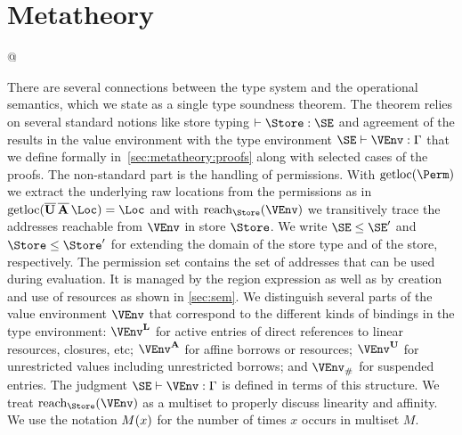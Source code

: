 \section{Metatheory}
\label{sec:metatheory}

\lstMakeShortInline[keepspaces,style=rule]@

There are several connections between the type system and
the operational semantics, which we state as a single type soundness
theorem.
%
The theorem relies on several standard notions like store typing
$\vdash \Store : \SE$ and agreement of the results in the value environment
with the type environment $\SE \vdash \VEnv:\E$ that we define
formally in~\cref{sec:metatheory:proofs} along with selected cases of the
proofs.
%
The non-standard part is the handling of permissions. With
$\Rawloc\Perm$ we extract the underlying raw locations from the
permissions as in $\Rawloc{\Multi\IBORROW\hspace{0.5mm}\Multi\MBORROW\hspace{0.5mm}\Loc} = \Loc$
and with $\Reach\Store\VEnv$ we transitively trace the
addresses reachable from $\VEnv$ in store $\Store$. We write
$\SE\le\SE'$ and $\Store \le \Store'$ for extending the domain of the
store type and of the store, respectively.
%
The permission set contains the set
of addresses that can be used during evaluation. It is managed by the
region expression as well as by creation and use of resources as
shown in \cref{sec:sem}.
%
We distinguish several parts of the value
environment $\VEnv$ that correspond to the different kinds of bindings in the
type environment: $\Active\VEnv$ for active entries of direct
references to linear resources, closures, etc; $\MutableBorrows\VEnv$ for
affine borrows or resources;
$\ImmutableBorrows\VEnv$ for unrestricted values including
unrestricted borrows;
and $\Suspended\VEnv$ for suspended entries. The judgment
$\SE \vdash \VEnv:\E$ is defined in terms of this structure.
We treat
$\Reach\Store\VEnv$ as a multiset to properly discuss linearity and
affinity. We use the notation $\MultiNumber x M$ for the number of
times $x$ occurs in multiset $M$.

